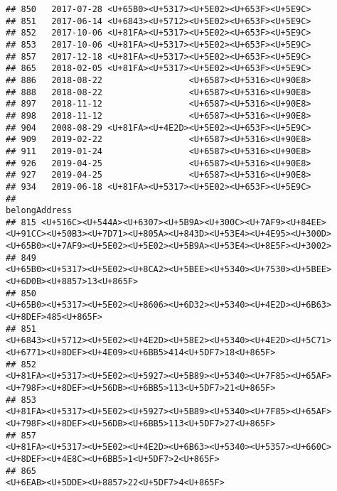 \documentclass[
]{article}
\begin{document}
\begin{verbatim}
## 850   2017-07-28 <U+65B0><U+5317><U+5E02><U+653F><U+5E9C>
## 851   2017-06-14 <U+6843><U+5712><U+5E02><U+653F><U+5E9C>
## 852   2017-10-06 <U+81FA><U+5317><U+5E02><U+653F><U+5E9C>
## 853   2017-10-06 <U+81FA><U+5317><U+5E02><U+653F><U+5E9C>
## 857   2017-12-18 <U+81FA><U+5317><U+5E02><U+653F><U+5E9C>
## 865   2018-02-05 <U+81FA><U+5317><U+5E02><U+653F><U+5E9C>
## 886   2018-08-22                 <U+6587><U+5316><U+90E8>
## 888   2018-08-22                 <U+6587><U+5316><U+90E8>
## 897   2018-11-12                 <U+6587><U+5316><U+90E8>
## 898   2018-11-12                 <U+6587><U+5316><U+90E8>
## 904   2008-08-29 <U+81FA><U+4E2D><U+5E02><U+653F><U+5E9C>
## 909   2019-02-22                 <U+6587><U+5316><U+90E8>
## 911   2019-01-24                 <U+6587><U+5316><U+90E8>
## 926   2019-04-25                 <U+6587><U+5316><U+90E8>
## 927   2019-04-25                 <U+6587><U+5316><U+90E8>
## 934   2019-06-18 <U+81FA><U+5317><U+5E02><U+653F><U+5E9C>
##                                                                                                                                                                                belongAddress
## 815 <U+516C><U+544A><U+6307><U+5B9A><U+300C><U+7AF9><U+84EE><U+91CC><U+50B3><U+7D71><U+805A><U+843D><U+53E4><U+4E95><U+300D><U+65B0><U+7AF9><U+5E02><U+5E02><U+5B9A><U+53E4><U+8E5F><U+3002>
## 849                                                                                               <U+65B0><U+5317><U+5E02><U+8CA2><U+5BEE><U+5340><U+7530><U+5BEE><U+6D0B><U+8857>13<U+865F>
## 850                                                                                                      <U+65B0><U+5317><U+5E02><U+8606><U+6D32><U+5340><U+4E2D><U+6B63><U+8DEF>485<U+865F>
## 851                                                                    <U+6843><U+5712><U+5E02><U+4E2D><U+58E2><U+5340><U+4E2D><U+5C71><U+6771><U+8DEF><U+4E09><U+6BB5>414<U+5DF7>18<U+865F>
## 852                                                                    <U+81FA><U+5317><U+5E02><U+5927><U+5B89><U+5340><U+7F85><U+65AF><U+798F><U+8DEF><U+56DB><U+6BB5>113<U+5DF7>21<U+865F>
## 853                                                                    <U+81FA><U+5317><U+5E02><U+5927><U+5B89><U+5340><U+7F85><U+65AF><U+798F><U+8DEF><U+56DB><U+6BB5>113<U+5DF7>27<U+865F>
## 857                                                                               <U+81FA><U+5317><U+5E02><U+4E2D><U+6B63><U+5340><U+5357><U+660C><U+8DEF><U+4E8C><U+6BB5>1<U+5DF7>2<U+865F>
## 865                                                                                                                                              <U+6EAB><U+5DDE><U+8857>22<U+5DF7>4<U+865F>

\end{verbatim}
\end{document}
